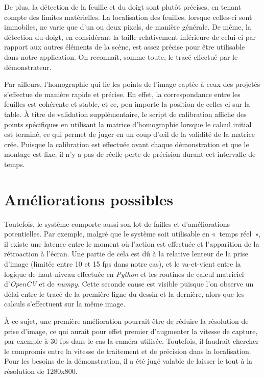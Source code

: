 \documentclass[11pt]{report}
\begin{document}
De plus, la détection de la feuille et du doigt sont plutôt précises, en
tenant compte des limites matérielles. La localisation des feuilles, lorsque
celles-ci sont immobiles, ne varie que d'un ou deux pixels, de manière générale.
De même, la détection du doigt, en considérant la taille relativement inférieure
de celui-ci par rapport aux autres éléments de la scène, est assez précise pour
être utilisable dans notre application. On reconnaît, somme toute, le tracé
effectué par le démonstrateur.

Par ailleurs, l'homographie qui lie les points de l'image captée à ceux des
projetés s'effectue de manière rapide et précise. En effet, la correspondance
entre les feuilles est cohérente et stable, et ce, peu importe la position de
celles-ci sur la table. À titre de validation supplémentaire, le script de
calibration affiche des points spécifiques en utilisant la matrice d'homographie
lorsque le calcul initial est terminé, ce qui permet de juger en un coup d'œil
de la validité de la matrice crée. Puisque la calibration est effectuée avant
chaque démonstration et que le montage est fixe, il n'y a pas de réelle perte de
précision durant cet intervalle de temps.


\chapter{Améliorations possibles}
Toutefois, le système comporte aussi son lot de failles et d'améliorations
potentielles. Par exemple, malgré que le système soit utilisable en « temps
réel », il existe une latence entre le moment où l'action est effectuée et
l'apparition de la rétroaction à l'écran. Une partie de cela est dû à la
relative lenteur de la prise d'image (limitée entre 10 et 15 fps dans notre
cas), et le va-et-vient entre la logique de haut-niveau effectuée en
\textit{Python} et les routines de calcul matriciel d'\textit{OpenCV} et de
\textit{numpy}. Cette seconde cause est visible puisque l'on observe un délai
entre le tracé de la première ligne du dessin et la dernière, alors que les
calculs s'effectuent sur la même image.

À ce sujet, une première amélioration pourrait être de réduire la résolution de
prise d'image, ce qui aurait pour effet premier d'augmenter la vitesse de
capture, par exemple à 30 fps dans le cas la caméra utilisée. Toutefois, il
faudrait chercher le compromis entre la vitesse de traitement et de précision
dans la localisation. Pour les besoins de la démonstration, il a été jugé
valable de laisser le tout à la résolution de 1280x800.
\end{document}

